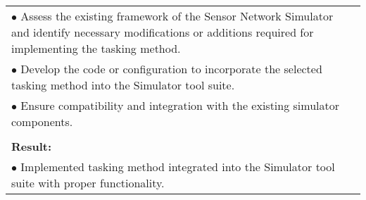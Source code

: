 \begin{table}[!h]
\begin{center}
\begin{tabular}{|p{35mm}||p{55mm}|p{50mm}||p{40mm}|}
      \multicolumn{4}{|p{150mm}|}{$\bullet$ Assess the existing framework of the Sensor Network Simulator and identify necessary modifications or additions required for implementing the tasking method.}\\
      \multicolumn{4}{|p{150mm}|}{$\bullet$ Develop the code or configuration to incorporate the selected tasking method into the Simulator tool suite.} \\
      \multicolumn{4}{|p{150mm}|}{$\bullet$ Ensure compatibility and integration with the existing simulator components.} \\
      \multicolumn{4}{|p{150mm}|}{}                                                                                                                                                                           \\
      \multicolumn{4}{|p{150mm}|}{\textbf{Result:}}                                                                                                                                                       \\
      \multicolumn{4}{|p{150mm}|}{$\bullet$ Implemented tasking method integrated into the Simulator tool suite with proper functionality.}                                                                                                                          \\
      \hline
    \end{tabular}
  \end{center}
\end{table}

\clearpage

